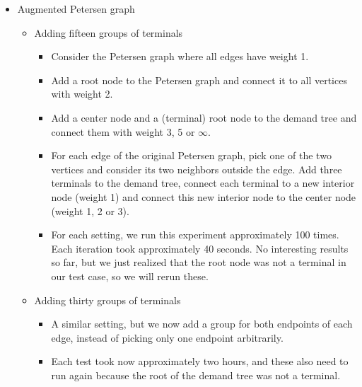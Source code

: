 \documentclass[11pt]{article}
\begin{document}
\begin{itemize}
        \item Augmented Petersen graph
        \begin{itemize}
            \item Adding fifteen groups of terminals
            \begin{itemize}
                \item Consider the Petersen graph where all edges have weight 1.
                \item Add a root node to the Petersen graph and connect it to all vertices with weight 2.
                \item Add a center node and a (terminal) root node to the demand tree and connect them with weight 3, 5 or $\infty$.
                \item For each edge of the original Petersen graph, pick one of the two vertices and consider its two neighbors outside the edge.
                Add three terminals to the demand tree, connect each terminal to a new interior node (weight 1) and connect this new interior node to the center node (weight 1, 2 or 3).
                \item For each setting, we run this experiment approximately 100 times.
                Each iteration took approximately 40 seconds.
                No interesting results so far, but we just realized that the root node was not a terminal in our test case, so we will rerun these.
            \end{itemize}
            \item Adding thirty groups of terminals
            \begin{itemize}
                \item A similar setting, but we now add a group for both endpoints of each edge, instead of picking only one endpoint arbitrarily.
                \item Each test took now approximately two hours, and these also need to run again because the root of the demand tree was not a terminal.
            \end{itemize}

        \end{itemize}
    \end{itemize}
\end{document}
